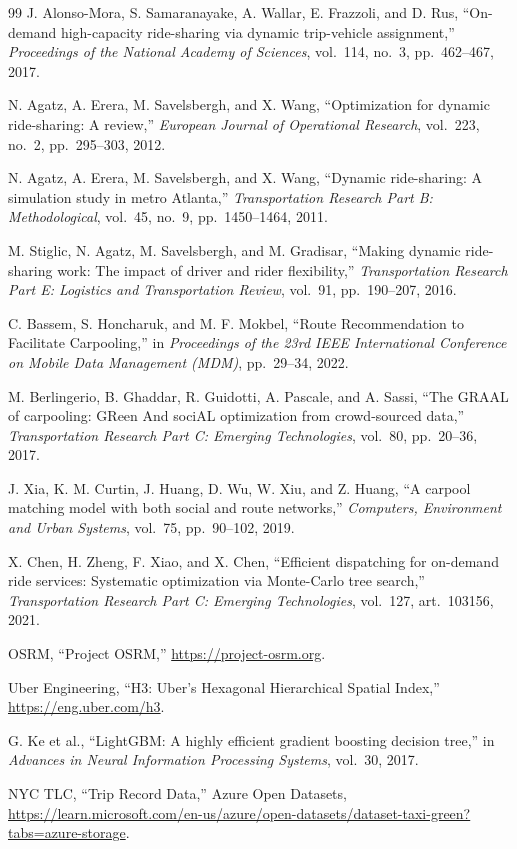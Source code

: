 \documentclass[11pt,a4paper]{article}
\begin{document}
\begin{thebibliography}{99}
J. Alonso-Mora, S. Samaranayake, A. Wallar, E. Frazzoli, and D. Rus, ``On-demand high-capacity ride-sharing via dynamic trip-vehicle assignment,'' \textit{Proceedings of the National Academy of Sciences}, vol.~114, no.~3, pp.~462--467, 2017.

N. Agatz, A. Erera, M. Savelsbergh, and X. Wang, ``Optimization for dynamic ride-sharing: A review,'' \textit{European Journal of Operational Research}, vol.~223, no.~2, pp.~295--303, 2012.

N. Agatz, A. Erera, M. Savelsbergh, and X. Wang, ``Dynamic ride-sharing: A simulation study in metro Atlanta,'' \textit{Transportation Research Part B: Methodological}, vol.~45, no.~9, pp.~1450--1464, 2011.

M. Stiglic, N. Agatz, M. Savelsbergh, and M. Gradisar, ``Making dynamic ride-sharing work: The impact of driver and rider flexibility,'' \textit{Transportation Research Part E: Logistics and Transportation Review}, vol.~91, pp.~190--207, 2016.

C. Bassem, S. Honcharuk, and M. F. Mokbel, ``Route Recommendation to Facilitate Carpooling,'' in \textit{Proceedings of the 23rd IEEE International Conference on Mobile Data Management (MDM)}, pp.~29--34, 2022.

M. Berlingerio, B. Ghaddar, R. Guidotti, A. Pascale, and A. Sassi, ``The GRAAL of carpooling: GReen And sociAL optimization from crowd-sourced data,'' \textit{Transportation Research Part C: Emerging Technologies}, vol.~80, pp.~20--36, 2017.

J. Xia, K. M. Curtin, J. Huang, D. Wu, W. Xiu, and Z. Huang, ``A carpool matching model with both social and route networks,'' \textit{Computers, Environment and Urban Systems}, vol.~75, pp.~90--102, 2019.

X. Chen, H. Zheng, F. Xiao, and X. Chen, ``Efficient dispatching for on-demand ride services: Systematic optimization via Monte-Carlo tree search,'' \textit{Transportation Research Part C: Emerging Technologies}, vol.~127, art.~103156, 2021.

OSRM, ``Project OSRM,'' \url{https://project-osrm.org}.

Uber Engineering, ``H3: Uber's Hexagonal Hierarchical Spatial Index,'' \url{https://eng.uber.com/h3}.

G. Ke et al., ``LightGBM: A highly efficient gradient boosting decision tree,'' in \textit{Advances in Neural Information Processing Systems}, vol.~30, 2017.

NYC TLC, ``Trip Record Data,'' Azure Open Datasets, \url{https://learn.microsoft.com/en-us/azure/open-datasets/dataset-taxi-green?tabs=azure-storage}.
\end{thebibliography}
\end{document}
